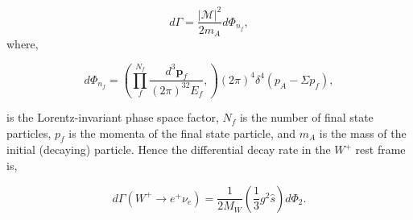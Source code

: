 \documentclass[a4paper,11pt]{article}
\begin{document}
\begin{equation}
	d\Gamma= \frac{|\mathcal{M}|^2 }{2m_A} d\Phi_{n_f},
\end{equation}
where,

$$ d\Phi_{n_f}=	 \left(\prod_{f}^{N_f}\frac{d^3\boldsymbol{p}_f}{(2\pi)^32E_f},\right) (2\pi)^4 \delta^4 (p_A - \Sigma p_f),$$

is the Lorentz-invariant phase space factor, $N_f$ is the number of final state particles, $p_f$ is the momenta of the final state particle, and $m_A$ is the mass of the initial (decaying) particle. Hence the differential decay rate in the $W^+$ rest frame is,

$$
d\Gamma (W^+ \rightarrow e^+ \nu_e) =  \frac{1}{2M_W} \left(\frac{1}{3}g^2 \hat{s}\right) d\Phi_{2}.
$$


\end{document}
